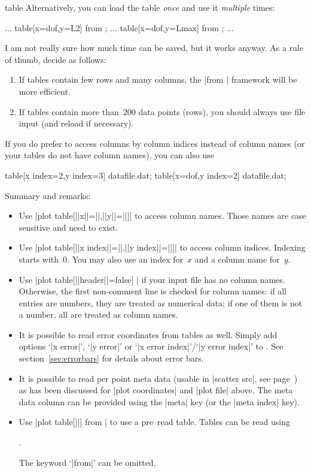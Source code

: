 \begin{addplotoperation}[]{table}{}
Alternatively, you can load the table \emph{once} and use it \emph{multiple} times:
\begin{codeexample}
\table
...
\addplot table[x=dof,y=L2] from \table;
...
\addplot table[x=dof,y=Lmax] from \table;
...
\end{codeexample}
I am not really sure how much time can be saved, but it works anyway. As a rule of thumb, decide as follows:
\begin{enumerate}
	\item If tables contain few rows and many columns, the |from | framework will be more efficient.
	\item If tables contain more than~$200$ data points (rows), you should always use file input (and reload if necessary).
\end{enumerate}

If you do prefer to access columns by column indices instead of column names (or your tables do not have column names), you can also use
\begin{codeexample}
\addplot table[x index=2,y index=3] {datafile.dat};
\addplot table[x=dof,y index=2] {datafile.dat};
\end{codeexample}

Summary and remarks:
\begin{itemize}
	\item Use |plot table[||x||=||,||y||=||]| to access column names. Those names are case sensitive and need to exist.
	\item Use |plot table[||x index||=||,||y index||=||]| to access column indices. Indexing starts with~$0$. You may also use an index for~$x$ and a column name for~$y$.
	\item Use |plot table[||header||=false] | if your input file has no column names. Otherwise, the first non-comment line is checked for column names: if all entries are numbers, they are treated as numerical data; if one of them is not a number, all are treated as column names.
	\item It is possible to read error coordinates from tables as well. Simply add options `|x error|', `|y error|' or `|x error index|'/`|y error index|' to . See section~\ref{sec:errorbars} for details about error bars.
	\item It is possible to read per point meta data (usable in |scatter src|, see page~\pageref{pgfplots:scatter:src}) as has been discussed for |plot coordinates| and |plot file| above. The meta data column can be provided using the |meta| key (or the |meta index| key).
	\item Use |plot table[||] from | to use a pre--read table. Tables can be read using
\begin{codeexample}
\macroname.
\end{codeexample}
		The keyword `|from|' can be omitted.


\end{itemize}
\end{addplotoperation}
